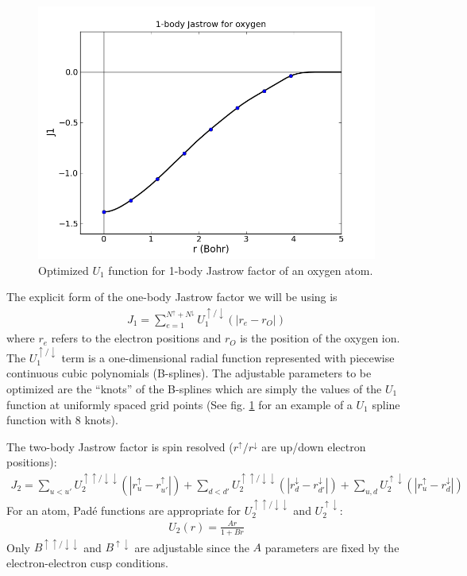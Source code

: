 {\begin{figure}
\begin{center}
\includegraphics[trim = 0mm 0mm 0mm 0mm, clip,width=0.75\columnwidth]{figures/lab_qmc_basics_J1.png}
\end{center}
\caption{Optimized $U_1$ function for 1-body Jastrow factor of an oxygen atom.
\label{fig:u1_spline}
}
\end{figure}

The explicit form of the one-body Jastrow factor we will be using is
\begin{align}\label{eq:J1}
  J_1 = \sum_{e=1}^{N^\uparrow+N^\downarrow}U_1^{\uparrow/\downarrow}(|r_e-r_O|)
\end{align}
where $r_e$ refers to the electron positions and $r_O$ is 
the position of the oxygen ion.  The $U_1^{\uparrow/\downarrow}$ term is a 
one-dimensional radial function represented with piecewise continuous cubic 
polynomials (B-splines).  The adjustable parameters to be optimized are the 
``knots'' of the B-splines which are simply the values of the $U_1$ function at 
uniformly spaced grid points (See fig. \ref{fig:u1_spline} for an example of a $U_1$ 
spline function with 8 knots).  

The two-body Jastrow factor is spin resolved ($r^\uparrow/r^\downarrow$ are up/down electron positions):
\begin{align}\label{eq:J2}
  J_2 = \sum_{u<u'}U_2^{\uparrow\uparrow/\downarrow\downarrow}(|r_u^\uparrow-r_{u'}^\uparrow|) + \sum_{d<d'}U_2^{\uparrow\uparrow/\downarrow\downarrow}(|r_d^\downarrow-r_{d'}^\downarrow|) + \sum_{u,d} U_2^{\uparrow\downarrow}(|r_u^\uparrow-r_d^\downarrow|)
\end{align}
For an atom, Pad\'{e} functions are appropriate for $U_2^{\uparrow\uparrow/\downarrow\downarrow}$ and $U_2^{\uparrow\downarrow}$:
\begin{align}
  U_2(r) = \frac{Ar}{1+Br}
\end{align}
Only $B^{\uparrow\uparrow/\downarrow\downarrow}$ and $B^{\uparrow\downarrow}$ are adjustable since the $A$ parameters are fixed by the electron-electron cusp conditions.

}
